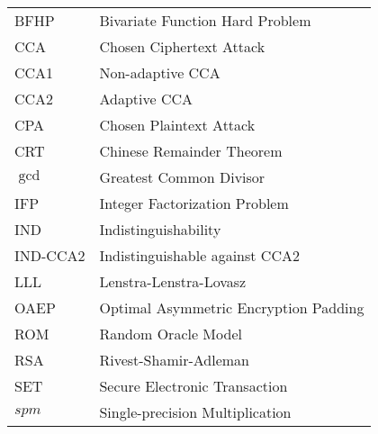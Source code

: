 \begin{center}
\begin{tabular}{ll}
BFHP 		&\hspace{2cm} Bivariate Function Hard Problem \\
CCA			&\hspace{2cm} Chosen Ciphertext Attack\\
CCA1		&\hspace{2cm} Non-adaptive CCA\\
CCA2		&\hspace{2cm} Adaptive CCA\\
CPA			&\hspace{2cm} Chosen Plaintext Attack\\
CRT    		&\hspace{2cm} Chinese Remainder Theorem \\
$\gcd$		&\hspace{2cm} Greatest Common Divisor \\
IFP			&\hspace{2cm} Integer Factorization Problem \\
IND			&\hspace{2cm} Indistinguishability\\
IND-CCA2	&\hspace{2cm} Indistinguishable against CCA2\\
LLL			&\hspace{2cm} Lenstra-Lenstra-Lovasz\\
OAEP		&\hspace{2cm} Optimal Asymmetric Encryption Padding\\
ROM			&\hspace{2cm} Random Oracle Model\\
RSA			&\hspace{2cm} Rivest-Shamir-Adleman\\
SET			&\hspace{2cm} Secure Electronic Transaction \\
$spm$		&\hspace{2cm} Single-precision Multiplication \\
\end{tabular}
\end{center}







